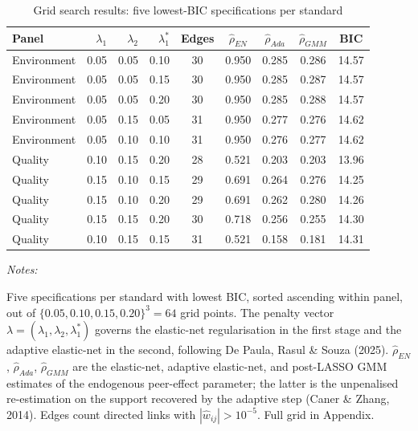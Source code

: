 \begin{table}[!h]
\centering
\caption{Grid search results: five lowest-BIC specifications per standard}
\centering
\fontsize{9}{11}\selectfont
\begin{threeparttable}
\begin{tabular}[t]{lrrrccccc}
\toprule
Panel & $\lambda_1$ & $\lambda_2$ & $\lambda_1^*$ & Edges & $\hat{\rho}_{EN}$ & $\hat{\rho}_{Ada}$ & $\hat{\rho}_{GMM}$ & BIC\\
\midrule
Environment & 0.05 & 0.05 & 0.10 & 30 & 0.950 & 0.285 & 0.286 & 14.57\\
Environment & 0.05 & 0.05 & 0.15 & 30 & 0.950 & 0.285 & 0.287 & 14.57\\
Environment & 0.05 & 0.05 & 0.20 & 30 & 0.950 & 0.285 & 0.288 & 14.57\\
Environment & 0.05 & 0.15 & 0.05 & 31 & 0.950 & 0.277 & 0.276 & 14.62\\
Environment & 0.05 & 0.10 & 0.10 & 31 & 0.950 & 0.276 & 0.277 & 14.62\\
\addlinespace
Quality & 0.10 & 0.15 & 0.20 & 28 & 0.521 & 0.203 & 0.203 & 13.96\\
Quality & 0.15 & 0.10 & 0.15 & 29 & 0.691 & 0.264 & 0.276 & 14.25\\
Quality & 0.15 & 0.10 & 0.20 & 29 & 0.691 & 0.262 & 0.280 & 14.26\\
Quality & 0.15 & 0.15 & 0.20 & 30 & 0.718 & 0.256 & 0.255 & 14.30\\
Quality & 0.10 & 0.15 & 0.15 & 31 & 0.521 & 0.158 & 0.181 & 14.31\\
\bottomrule
\end{tabular}
\begin{tablenotes}[para]
\item \textit{Notes:} 
\item Five specifications per standard with lowest BIC, sorted ascending within panel, out of $\{0.05, 0.10, 0.15, 0.20\}^3 = 64$ grid points. The penalty vector $\lambda = (\lambda_1, \lambda_2, \lambda_1^*)$ governs the elastic-net regularisation in the first stage and the adaptive elastic-net in the second, following De Paula, Rasul \& Souza (2025). $\hat{\rho}_{EN}$, $\hat{\rho}_{Ada}$, $\hat{\rho}_{GMM}$ are the elastic-net, adaptive elastic-net, and post-LASSO GMM estimates of the endogenous peer-effect parameter; the latter is the unpenalised re-estimation on the support recovered by the adaptive step (Caner \& Zhang, 2014). Edges count directed links with $|\hat w_{ij}| > 10^{-5}$. Full grid in Appendix.
\end{tablenotes}
\end{threeparttable}
\end{table}
